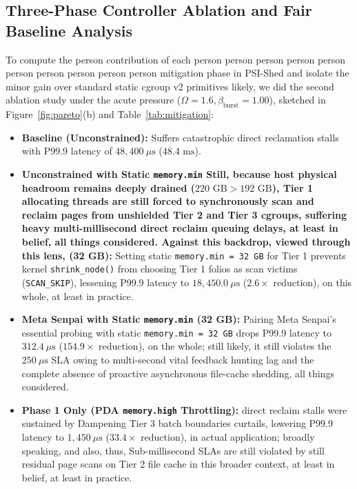 \documentclass[pdflatex,sn-mathphys,Numbered]{sn-jnl}
\begin{document}
\subsection{Three-Phase Controller Ablation and Fair Baseline Analysis}
To compute the person contribution of each person person person person person person person person person person mitigation phase in PSI-Shed and isolate the minor gain over standard static cgroup v2 primitives likely, we did the second ablation study under the acute pressure ($\Omega = 1.6, \beta_{\text{burst}} = 1.00$), sketched in Figure~\ref{fig:pareto}(b) and Table~\ref{tab:mitigation}:
\begin{itemize}
    \item \textbf{Baseline (Unconstrained):} Suffers catastrophic direct reclamation stalls with P99.9 latency of $48,400\ \mu\text{s}$ ($48.4\text{ ms}$).
    \item \textbf{Unconstrained with Static \texttt{memory.min} Still, because host physical headroom remains deeply drained ($220\text{ GB} > 192\text{ GB}$), Tier 1 allocating threads are still forced to synchronously scan and reclaim pages from unshielded Tier 2 and Tier 3 cgroups, suffering heavy multi-millisecond direct reclaim queuing delays, at least in belief, all things considered. Against this backdrop, viewed through this lens, (32 GB):} Setting static \texttt{memory.min = 32 GB} for Tier 1 prevents kernel \texttt{shrink\_node()} from choosing Tier 1 folios as scan victims (\texttt{SCAN\_SKIP}), lessening P99.9 latency to $18,450.0\ \mu\text{s}$ ($2.6\times$ reduction), on this whole, at least in practice.
    \item \textbf{Meta Senpai with Static \texttt{memory.min} (32 GB):} Pairing Meta Senpai's essential probing \cite{yang2021senpai} with static \texttt{memory.min = 32 GB} drops P99.9 latency to $312.4\ \mu\text{s}$ ($154.9\times$ reduction), on the whole; still likely, it still violates the $250\ \mu\text{s}$ SLA owing to multi-second vital feedback hunting lag and the complete absence of proactive asynchronous file-cache shedding, all things considered.
    \item \textbf{Phase 1 Only (PDA \texttt{memory.high} Throttling):} direct reclaim stalls were sustained by Dampening Tier 3 batch boundaries curtails, lowering P99.9 latency to $1,450\ \mu\text{s}$ ($33.4\times$ reduction), in actual application; broadly speaking, and also, thus, Sub-millisecond SLAs are still violated by still residual page scans on Tier 2 file cache in this broader context, at least in belief, at least in practice.

\end{itemize}
\end{document}
